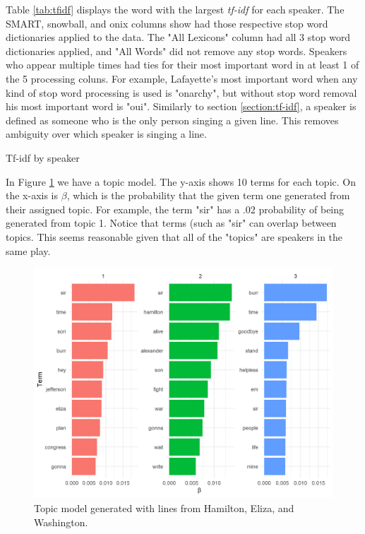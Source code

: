 \documentclass{article}
\begin{document}
Table \ref{tab:tfidf} displays the word with the largest \emph{tf-idf} for each speaker. The SMART, snowball, and onix columns show had those respective stop word dictionaries applied to the data. The "All Lexicons" column had all 3 stop word dictionaries applied, and "All Words" did not remove any stop words. Speakers who appear multiple times had ties for their most important word in at least 1 of the 5 processing coluns. For example, Lafayette's most important word when any kind of stop word processing is used is "onarchy", but without stop word removal his most important word is "oui". Similarly to section \ref{section:tf-idf}, a speaker is defined as someone who is the only person singing a given line. This removes ambiguity over which speaker is singing a line. 

\begin{table}
\caption{Tf-idf by speaker}
\label{tab:tfidf}

\end{table}

In Figure \ref{fig:topic_model} we have a topic model. The y-axis shows 10 terms for each topic. On the x-axis is $\beta$, which is the probability that the given term one generated from their assigned topic. For example, the term "sir" has a .02 probability of being generated from topic 1. Notice that terms (such as "sir" can overlap between topics. This seems reasonable given that all of the "topics" are speakers in the same play.

\begin{figure}[h]
    \caption{Topic model generated with lines from Hamilton, Eliza, and Washington. \label{fig:topic_model}}
    \centering
    \includegraphics[width=0.2\paperwidth]{topic_model.png}
\end{figure}
\end{document}
